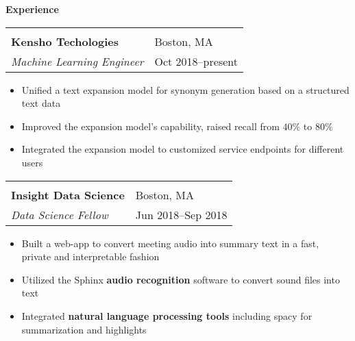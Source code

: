 \documentclass[letterpaper,11pt,oneside]{article}
\begin{document}
 \vspace{-0.35cm}
 \raggedright
 \textbf{\Large{Experience}} \sout{\hfill} \\
 \normalsize  
\begin{flushleft}
 \vspace{-0.35cm}
 \begin{tabular}{@{} l l }
    \hspace{0.78\linewidth} & \hspace{0.1\linewidth} \\
    \textbf{Kensho Techologies} & Boston, MA \\ 
    \textit{Machine Learning Engineer} & Oct 2018--present \\ 
 \end{tabular}
 \end{flushleft}
 \begin{flushleft}
 \begin{small}
 \begin{itemize}[leftmargin=*]
 \item Unified a text expansion model for synonym generation based on a structured text data
 \item Improved the expansion model's capability, raised recall from $40\%$ to $80\%$
 \item Integrated the expansion model to customized service endpoints for different users
 \end{itemize}
 \end{small}
 \end{flushleft}
\begin{flushleft}
 \vspace{-0.35cm}
 \begin{tabular}{@{} l l }
    \hspace{0.78\linewidth} & \hspace{0.1\linewidth} \\
    \textbf{Insight Data Science} & Boston, MA \\ 
    \textit{Data Science Fellow} & Jun 2018--Sep 2018 \\ 
 \end{tabular}
 \end{flushleft}
 \begin{flushleft}
 \begin{small}
 \begin{itemize}[leftmargin=*]
 \item Built a web-app to convert meeting audio into summary text in a fast, private and interpretable fashion
 \item Utilized the Sphinx \textbf{audio recognition} software to convert sound files into text
 \item Integrated \textbf{natural language processing tools} including spacy for summarization and highlights
 \end{itemize}
 \end{small}
 \end{flushleft}
\end{document}
